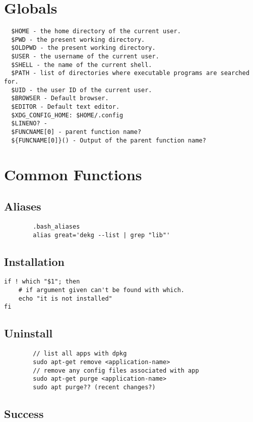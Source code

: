 \section{Globals}
\begin{verbatim}
  $HOME - the home directory of the current user.
  $PWD - the present working directory.
  $OLDPWD - the present working directory.
  $USER - the username of the current user.
  $SHELL - the name of the current shell.
  $PATH - list of directories where executable programs are searched for.
  $UID - the user ID of the current user.
  $BROWSER - Default browser.
  $EDITOR - Default text editor.
  $XDG_CONFIG_HOME: $HOME/.config
  $LINENO? -
  $FUNCNAME[0] - parent function name?
  ${FUNCNAME[0]}() - Output of the parent function name?
\end{verbatim}

\section{Common Functions}

\subsection{Aliases}

\begin{verbatim}
        .bash_aliases
        alias great='dekg --list | grep "lib"'
\end{verbatim}

\subsection{Installation}
\begin{verbatim}
if ! which "$1"; then
    # if argument given can't be found with which. 
    echo "it is not installed"
fi
\end{verbatim}
\subsection{Uninstall}

\begin{verbatim}
        // list all apps with dpkg
        sudo apt-get remove <application-name>
        // remove any config files associated with app
        sudo apt-get purge <application-name>
        sudo apt purge?? (recent changes?) 
\end{verbatim}

\subsection{Success}

